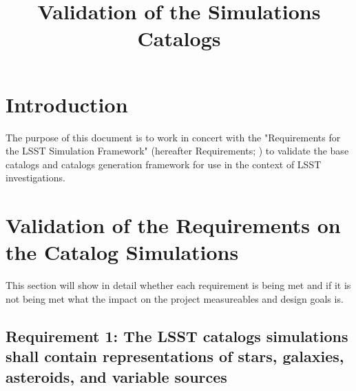 \documentclass[]{article}
\begin{document}
 
\sloppy
\title
{Validation of the Simulations Catalogs}


\label{firstpage}


\maketitle 
\section{Introduction \label{sec:intro}}
The purpose of this document is to work in concert with the "Requirements for the 
LSST Simulation Framework" (hereafter Requirements; \cite{requirements}) to validate the
base catalogs and catalogs generation framework for use in the context of
LSST investigations. 
\section{Validation of the Requirements on the Catalog Simulations}
This section will show in detail whether each requirement is being met and if it is not
being met what the impact on the project measureables and design goals is.
\subsection{Requirement 1: The LSST catalogs simulations shall contain representations of stars,
galaxies, asteroids, and variable sources}
\end{document}
